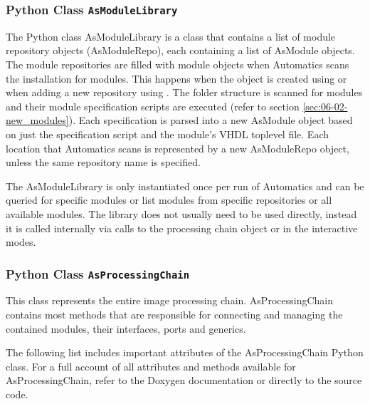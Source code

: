 \subsubsection{Python Class \texttt{AsModuleLibrary}}

The Python class AsModuleLibrary is a class that contains a list of module repository objects (AsModuleRepo), each containing a list of AsModule objects.
The module repositories are filled with module objects when Automatics scans the \asterics installation for modules.
This happens when the  object is created using  or when adding a new repository using .
The folder structure is scanned for modules and their module specification scripts are executed (refer to section \ref{sec:06-02-new_modules}).
Each specification is parsed into a new AsModule object based on just the specification script and the module's VHDL toplevel file.
Each location that Automatics scans is represented by a new AsModuleRepo object, unless the same repository name is specified.

The AsModuleLibrary is only instantiated once per run of Automatics and can be queried for specific modules or list modules from specific repositories or all available modules.
The library does not usually need to be used directly, instead it is called internally via calls to the processing chain object or in the interactive modes.

\subsubsection{Python Class \texttt{AsProcessingChain}}

This class represents the entire image processing chain.
AsProcessingChain contains most methods that are responsible for connecting and managing the contained modules, their interfaces, ports and generics.

The following list includes important attributes of the AsProcessingChain Python class.
For a full account of all attributes and methods available for AsProcessingChain, refer to the Doxygen documentation or directly to the source code.

